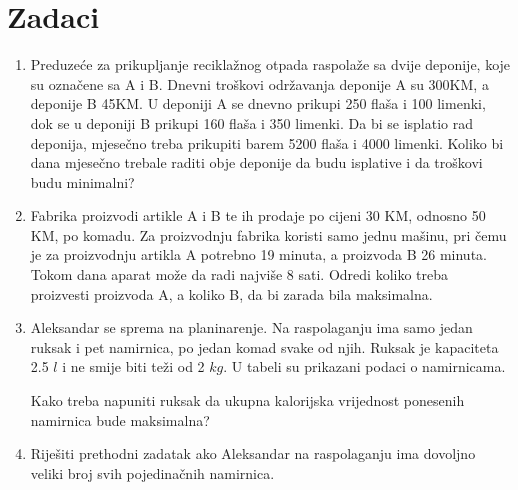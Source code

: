 \documentclass[a4paper, utf8, 11pt, colorlinks]{book}
\theoremstyle{definition}
\begin{document}
\section{Zadaci}
\begin{enumerate}
	
	\item Preduzeće za prikupljanje reciklažnog otpada raspolaže sa dvije deponije, koje su označene sa A i B. Dnevni troškovi održavanja deponije A su 300KM, a deponije B 45KM.  U deponiji A se dnevno prikupi 250 flaša i 100 limenki, dok se u deponiji B prikupi 160 flaša i 350 limenki. Da bi se isplatio rad deponija, mjesečno treba prikupiti barem 5200 flaša i 4000 limenki.
	Koliko bi dana mjesečno trebale raditi obje deponije da budu isplative i da troškovi budu minimalni?
	
	\item Fabrika proizvodi artikle A i B te ih prodaje po cijeni 30 KM, odnosno 50 KM, po komadu. Za
	proizvodnju fabrika koristi samo jednu mašinu, pri čemu je za proizvodnju artikla A potrebno 19
	minuta, a proizvoda B 26 minuta. Tokom dana aparat može da radi najviše 8 sati. Odredi koliko treba
	proizvesti proizvoda A, a koliko B, da bi zarada bila maksimalna.
	
	\item Aleksandar se sprema na planinarenje. Na raspolaganju ima samo jedan ruksak i pet namirnica, po jedan
	komad svake od njih. Ruksak je kapaciteta 2.5 $l$ i ne smije biti teži od 2 $kg$. U tabeli su
	prikazani podaci o namirnicama.
	\begin{table}[H]
		\centering
	\end{table}
	Kako treba napuniti ruksak da ukupna kalorijska vrijednost ponesenih namirnica bude maksimalna?
	
	\item Riješiti prethodni zadatak ako Aleksandar na raspolaganju ima dovoljno veliki broj svih pojedinačnih namirnica.
	

\end{enumerate}
\end{document}
